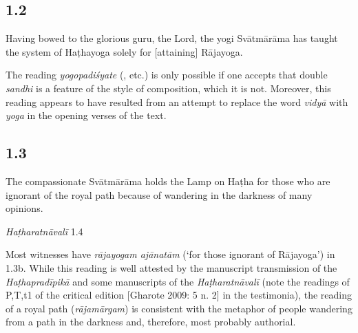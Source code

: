 \begin{ekdosis}
\begin{philcomm}[hp01_001]
\end{philcomm}

\subsection*{1.2}
\begin{translation}[hp01_002]
Having bowed to the glorious guru, the Lord, the yogi Svātmārāma has taught the system of Haṭhayoga solely for [attaining] Rājayoga.
\end{translation}

\begin{philcomm}[hp01_002]
The reading \emph{yogopadiśyate} (, etc.) is only possible if one accepts that double \emph{sandhi} is a feature of the style of composition, which it is not. Moreover, this reading appears to have resulted from an attempt to replace the word \emph{vidyā} with \emph{yoga} in the opening verses of the text.
\end{philcomm}

\subsection*{1.3}
\begin{translation}[hp01_003]
The compassionate Svātmārāma holds the Lamp on Haṭha for those who are ignorant of the royal path because of wandering in the darkness of many opinions.
\end{translation}

\begin{testimonia}[hp01_003]
\emph{Haṭharatnāvalī} 1.4

\begin{versinnote}
\tl{\var{rājayogam ] rājamārgam P,T,t1}\\!}
\end{versinnote}

\end{testimonia}

\begin{philcomm}[hp01_003] 
Most witnesses have \emph{rājayogam ajānatām} (`for those ignorant of Rājayoga') in 1.3b. While this reading is well attested by the manuscript transmission of the \emph{Haṭhapradīpikā} and some manuscripts of the \emph{Haṭharatnāvalī} (note the readings of P,T,t1 of the critical edition [Gharote 2009: 5 n. 2] in the testimonia), the reading of a royal path (\emph{rājamārgam}) is consistent with the metaphor of people wandering from a path in the darkness and, therefore, most probably authorial. 


\end{philcomm}
\end{ekdosis}
